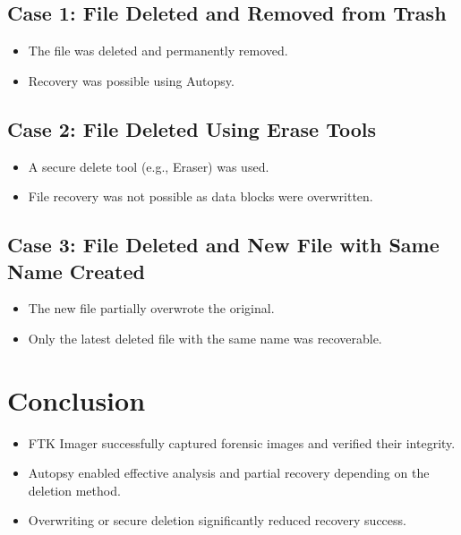 \documentclass[11pt]{article}
\begin{document}
\subsection{Case 1: File Deleted and Removed from Trash}
\begin{itemize}
    \item The file was deleted and permanently removed.
    \item Recovery was possible using Autopsy.
\end{itemize}


\subsection{Case 2: File Deleted Using Erase Tools}
\begin{itemize}
    \item A secure delete tool (e.g., Eraser) was used.
    \item File recovery was not possible as data blocks were overwritten.
\end{itemize}


\subsection{Case 3: File Deleted and New File with Same Name Created}
\begin{itemize}
    \item The new file partially overwrote the original.
    \item Only the latest deleted file with the same name was recoverable.
\end{itemize}

\section{Conclusion}
\begin{itemize}
    \item FTK Imager successfully captured forensic images and verified their integrity.
    \item Autopsy enabled effective analysis and partial recovery depending on the deletion method.
    \item Overwriting or secure deletion significantly reduced recovery success.
\end{itemize}
\end{document}
